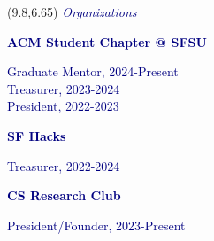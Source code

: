 \documentclass[hidelinks, 10pt]{article}
\begin{document}
\begin{textblock}{3.9}(9.8,6.65)
    \setlength{\parindent}{0cm}
    \large{\textcolor{navy}{\textit{Organizations}}}

    \vspace{1mm}

    \footnotesize\textcolor{navy}{\scriptsize\textbf{ACM Student Chapter @ SFSU}}

    \vspace{0.5mm}

    \footnotesize\textcolor{navy}{\scriptsize Graduate Mentor, 2024-Present\\
        Treasurer, 2023-2024\\President, 2022-2023 }

    \vspace{1mm}

    \footnotesize\textcolor{navy}{\scriptsize\textbf{SF Hacks}}

    \vspace{0.5mm}

    \scriptsize\textcolor{navy}{\scriptsize Treasurer, 2022-2024}

    \vspace{1mm}

    \footnotesize\textcolor{navy}{\scriptsize\textbf{CS Research Club}}

    \vspace{0.5mm}

    \scriptsize\textcolor{navy}{\scriptsize President/Founder, 2023-Present}

\end{textblock}

\end{document}
